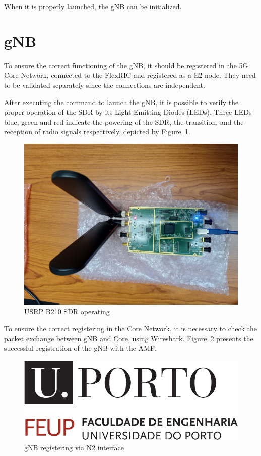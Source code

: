When it is properly launched, the gNB can be initialized.

\section{gNB}\label{sec:gnb}
To ensure the correct functioning of the gNB, it should be registered in the 5G Core Network, connected to the FlexRIC and registered as a E2 node.
They need to be validated separately since the connections are independent.

After executing the command to launch the gNB\@, it is possible to verify the proper operation of the SDR by its Light-Emitting Diodes (LEDs).
Three LEDs blue, green and red indicate the powering of the SDR, the transition, and the reception of radio signals respectively, depicted by Figure~\ref{fig:usrp_working}.

\begin{figure}[H]
    \centering
    \includegraphics[width=0.5\linewidth]{figures/usrp_working}
    \caption[USRP B210 SDR operating]{USRP B210 SDR operating}
    \label{fig:usrp_working}
\end{figure}

To ensure the correct registering in the Core Network, it is necessary to check the packet exchange between gNB and Core, using Wireshark.
Figure~\ref{fig:gnb_reg} presents the successful registration of the gNB with the AMF\@.

\begin{figure}[H]
    \centering
    \includegraphics[width=0.5\linewidth]{figures/uporto-feup}
    \caption[gNB registering via N2 interface]{gNB registering via N2 interface}
    \label{fig:gnb_reg}
\end{figure}

